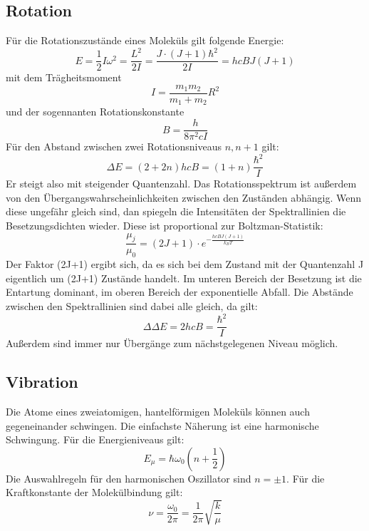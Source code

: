 \documentclass[11pt]{article}
\begin{document}
\subsection{Rotation}
Für die Rotationszustände eines Moleküls gilt folgende Energie:
\begin{equation}
  E=\frac{1}{2}I\omega^2=\frac{L^2}{2I}=\frac{J\cdot(J+1)\hbar^2}{2I}=hcBJ(J+1)
\end{equation}
mit dem Trägheitsmoment
\begin{equation}
  I=\frac{m_1m_2}{m_1+m_2}R^2
\end{equation}
und der sogennanten Rotationskonstante
\begin{equation}
  B=\frac{h}{8\pi^2cI}
\end{equation}
Für den Abstand zwischen zwei Rotationsniveaus $n, n+1$ gilt:
\begin{equation}
  \Delta E=(2+2n)hcB=(1+n)\frac{\hbar^2}{I}
\end{equation}
Er steigt also mit steigender Quantenzahl. Das Rotationsspektrum ist außerdem
von den Übergangswahrscheinlichkeiten zwischen den Zuständen abhängig. Wenn
diese ungefähr gleich sind, dan spiegeln die Intensitäten der Spektrallinien
die Besetzungsdichten wieder. Diese ist proportional zur Boltzman-Statistik:
\begin{equation}
  \frac{\mu_j}{\mu_0}=(2J+1)\cdot e^{-\frac{hcBJ(J+1)}{k_BT}}
\end{equation}
Der Faktor (2J+1) ergibt sich, da es sich bei dem Zustand mit der Quantenzahl J
eigentlich um (2J+1) Zustände handelt. Im unteren Bereich der Besetzung ist die
Entartung dominant, im oberen Bereich der exponentielle Abfall. Die Abstände
zwischen den Spektrallinien sind dabei alle gleich, da gilt:
\begin{equation}
  \Delta\Delta E=2hcB=\frac{\hbar^2}{I}
\end{equation}
Außerdem sind immer nur Übergänge zum nächstgelegenen Niveau möglich.

\subsection{Vibration}
Die Atome eines zweiatomigen, hantelförmigen Moleküls können auch gegeneinander
schwingen. Die einfachste Näherung ist eine harmonische Schwingung. Für die
Energieniveaus gilt:
\begin{equation}
  E_\mu=\hbar\omega_0\left(n+\frac{1}{2}\right)
\end{equation}
Die Auswahlregeln für den harmonischen Oszillator sind $n=\pm1$.
Für die Kraftkonstante der Molekülbindung gilt:
\begin{equation}
  \nu=\frac{\omega_0}{2\pi}=\frac{1}{2\pi}\sqrt{\frac{k}{\mu}}
\end{equation}
\end{document}
